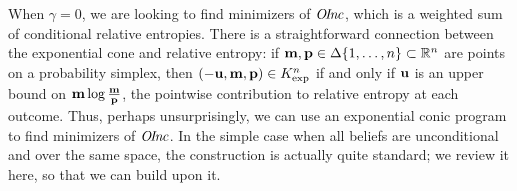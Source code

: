 \documentclass{article}
\newcommand\discard[1]{}
\newcommand\voli[1]{{\color{olicolor}\textbf{$\boldsymbol\{$Oli: }#1 \textbf{$\boldsymbol\}$}}}
\begin{document}
When $\gamma = 0$, we are looking to find minimizers of $\mathit{O\mskip-2.5muI\mskip-3.5mun\mskip-1.7muc}$,
which is a
weighted sum of conditional relative entropies.
There is a straightforward connection between the exponential cone and
relative entropy:
if $\mathbf{m}, \mathbf{p} \in
\Delta \{1, \ldots, n\}
\subset \mathbb R^n$ are points on
a probability simplex,
then $(-\mathbf{u}, \mathbf{m}, \mathbf{p}) \in K_{\exp}^n$ if and only if
$\mathbf{u}$ is an upper bound on $\mathbf{m} \log \frac{\mathbf{m}}{\mathbf{p}}$,
the pointwise contribution to relative entropy at each outcome.
Thus, perhaps unsurprisingly, we can use an exponential conic program to
find minimizers of $\mathit{O\mskip-2.5muI\mskip-3.5mun\mskip-1.7muc}$.
In the simple case when all beliefs are unconditional and over the same space,
the construction is actually quite standard;
we review it here, so that we can build upon it.
\end{document}
